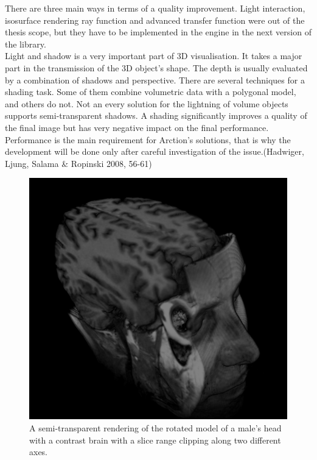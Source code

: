 \documentclass[twoside, english, 11pt]{report}
\begin{document}
There are three main ways in terms of a quality improvement. Light interaction, isosurface rendering ray function and advanced transfer function were out of the thesis scope, but they have to be implemented in the engine in the next version of the library.\\

Light and shadow is a very important part of 3D visualisation. It takes a major part in the transmission of the 3D object's shape. The depth is usually evaluated by a combination of shadows and perspective. There are several techniques for a shading task. Some of them combine volumetric data with a polygonal model, and others do not. Not an every solution for the lightning of volume objects supports semi-transparent shadows. A shading significantly improves a quality of the final image but has very negative impact on the final performance. Performance is the main requirement for Arction's solutions, that is why the development will be done only after careful investigation of the issue.(Hadwiger, Ljung, Salama \& Ropinski 2008, 56-61)\\

\begin{figure}[H]
\centerline{\includegraphics[scale = 0.7]{img/cuttedhead}}
\caption{A semi-transparent rendering of the rotated model of a male's head with a contrast brain with a slice range clipping along two different axes.\label{fig:cuttedhead}}
\end{figure}
\end{document}
